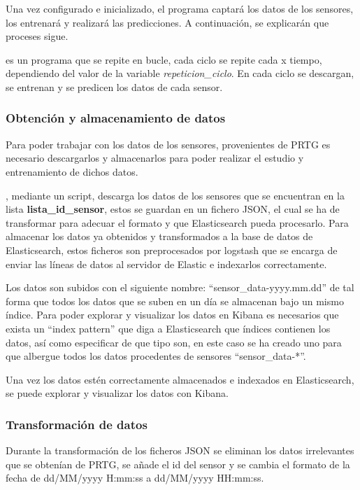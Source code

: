 Una vez configurado e inicializado, el programa captará los datos de los sensores, los entrenará y realizará las predicciones. A continuación, se explicarán que proceses sigue. 

\nombrePrograma es un programa que se repite en bucle, cada ciclo se repite cada x tiempo, dependiendo del valor de la variable \textit{repeticion\_ciclo}. En cada ciclo se descargan, se entrenan y se predicen los datos de cada sensor. 

\subsubsection{Obtención y almacenamiento de datos}\label{cap:obt_alm_datos}

Para poder trabajar con los datos de los sensores, provenientes de PRTG es necesario descargarlos y almacenarlos para poder realizar el estudio y entrenamiento de dichos datos.

\nombrePrograma, mediante un script, descarga los datos de los sensores que se encuentran en la lista \textbf{lista\_id\_sensor}, estos se guardan en un fichero JSON, el cual se ha de transformar para adecuar el formato y que Elasticsearch pueda procesarlo. Para almacenar los datos ya obtenidos y transformados a la base de datos de Elasticsearch, estos ficheros son preprocesados por logstash que se encarga de enviar las líneas de datos al servidor de Elastic e indexarlos correctamente.

Los datos son subidos con el siguiente nombre: ``sensor\_data-yyyy.mm.dd'' de tal forma que todos los datos que se suben en un día se almacenan bajo un mismo índice. Para poder explorar y visualizar los datos en Kibana es necesarios que exista un ``index pattern'' que diga a Elasticsearch que índices contienen los datos, así como especificar de que tipo son, en este caso se ha creado uno para que albergue todos los datos procedentes de sensores ``sensor\_data-*''. 

Una vez los datos estén correctamente almacenados e indexados en Elasticsearch, se puede explorar y visualizar los datos con Kibana.


\newpage
\subsubsection{Transformación de datos}\label{cap:TransformacionDatos}

Durante la transformación de los ficheros JSON se eliminan los datos irrelevantes que se obtenían de PRTG, se añade el id del sensor y se cambia el formato de la fecha de dd/MM/yyyy H:mm:ss a dd/MM/yyyy HH:mm:ss.

